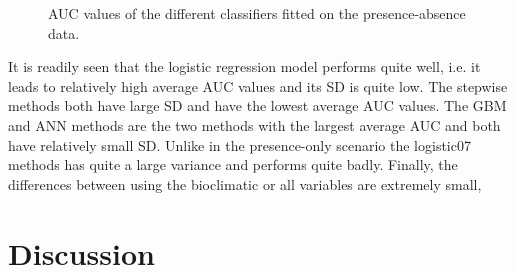 \begin{figure}[!htb]
\center
{}
\caption{\label{fig:PrAbAUC}AUC values of the different classifiers fitted on the presence-absence data.}
\end{figure}

It is readily seen that the logistic regression model performs quite well, i.e. it leads to relatively high average AUC values and its SD is quite low. The stepwise methods both have large SD and have the lowest average AUC values. The GBM and ANN methods are the two methods with the largest average AUC and both have relatively small SD. Unlike in the presence-only scenario the logistic07 methods has quite a large variance and performs quite badly. Finally, the differences between using the bioclimatic or all variables are extremely small, 



\section{Discussion}

